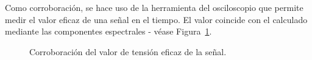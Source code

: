       Como corroboración, se hace uso de la herramienta del osciloscopio que permite medir el
      valor eficaz de una señal en el tiempo. El valor coincide con el calculado mediante 
      las componentes espectrales - véase Figura~\ref{fig:CorroboraVrms}.

      \begin{figure}[H]
        \centering
        \caption{Corroboración del valor de tensión eficaz de la señal.}
        \label{fig:CorroboraVrms}
      \end{figure}


    \pagebreak

